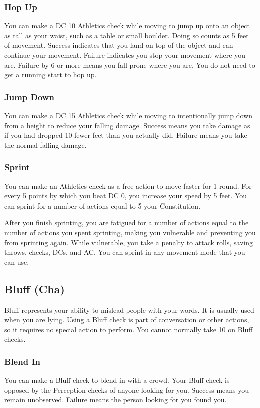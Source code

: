 \subsubsection{Hop Up}
You can make a DC 10 Athletics check while moving to jump up onto an object as tall as your waist, such as a table or small boulder. Doing so counts as 5 feet of movement. Success indicates that you land on top of the object and can continue your movement. Failure indicates you stop your movement where you are. Failure by 6 or more means you fall prone where you are. You do not need to get a running start to hop up.

\subsubsection{Jump Down}
You can make a DC 15 Athletics check while moving to intentionally jump down from a height to reduce your falling damage. Success means you take damage as if you had dropped 10 fewer feet than you actually did. Failure means you take the normal falling damage.

\subsubsection{Sprint}\label{Sprint}
You can make an Athletics check as a free action to move faster for 1 round. For every 5 points by which you beat DC 0, you increase your speed by 5 feet. You can sprint for a number of actions equal to 5 \add your Constitution.

After you finish sprinting, you are fatigued for a number of actions equal to the number of actions you spent sprinting, making you vulnerable and preventing you from sprinting again. While vulnerable, you take a  penalty to attack rolls, saving throws, checks, DCs, and AC. You can sprint in any movement mode that you can use.

\subsection{Bluff (Cha)}
Bluff represents your ability to mislead people with your words. It is usually used when you are lying. Using a Bluff check is part of conversation or other actions, so it requires no special action to perform. You cannot normally take 10 on Bluff checks.

\subsubsection{Blend In}
You can make a Bluff check to blend in with a crowd. Your Bluff check is opposed by the Perception checks of anyone looking for you. Success means you remain unobserved. Failure means the person looking for you found you.

